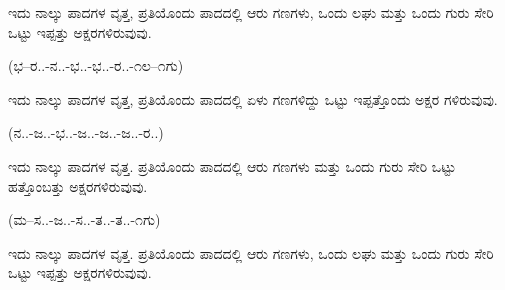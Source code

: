 
\vspace{4pt plus 4pt minus 1pt}\hspace{0.5em}ಇದು ನಾಲ್ಕು ಪಾದಗಳ ವೃತ್ತ, ಪ್ರತಿಯೊಂದು ಪಾದದಲ್ಲಿ ಆರು ಗಣಗಳು, ಒಂದು ಲಘು ಮತ್ತು ಒಂದು ಗುರು ಸೇರಿ ಒಟ್ಟು ಇಪ್ಪತ್ತು ಅಕ್ಷರಗಳಿರುವುವು.\par

\begin{kbvnote}
\hspace{0.5em}(ಭ--ರ..-ನ..-ಭ..-ಭ..-ರ..-೧ಲ--೧ಗು)
\end{kbvnote}

\vspace{4pt plus 4pt minus 1pt}\hspace{0.5em}ಇದು ನಾಲ್ಕು ಪಾದಗಳ ವೃತ್ತ, ಪ್ರತಿಯೊಂದು ಪಾದದಲ್ಲಿ ಏಳು ಗಣಗಳಿದ್ದು ಒಟ್ಟು ಇಪ್ಪತ್ತೊಂದು ಅಕ್ಷರ ಗಳಿರುವುವು.\par

\begin{kbvnote}
\hspace{0.5em}(ನ..-ಜ..-ಭ..-ಜ..-ಜ..-ಜ..-ರ..)
\end{kbvnote}

\vspace{4pt plus 4pt minus 1pt}\hspace{0.5em}ಇದು ನಾಲ್ಕು ಪಾದಗಳ ವೃತ್ತ. ಪ್ರತಿಯೊಂದು ಪಾದದಲ್ಲಿ ಆರು ಗಣಗಳು ಮತ್ತು ಒಂದು ಗುರು ಸೇರಿ ಒಟ್ಟು ಹತ್ತೊಂಬತ್ತು ಅಕ್ಷರಗಳಿರುವುವು.\par

\begin{kbvnote}
\hspace{0.5em}(ಮ--ಸ..-ಜ..-ಸ..-ತ..-ತ..-೧ಗು)
\end{kbvnote}

\vspace{4pt plus 4pt minus 1pt}\hspace{0.5em}ಇದು ನಾಲ್ಕು ಪಾದಗಳ ವೃತ್ತ. ಪ್ರತಿಯೊಂದು ಪಾದದಲ್ಲಿ ಆರು ಗಣಗಳು, ಒಂದು ಲಘು ಮತ್ತು ಒಂದು ಗುರು ಸೇರಿ ಒಟ್ಟು ಇಪ್ಪತ್ತು ಅಕ್ಷರಗಳಿರುವುವು.\par

